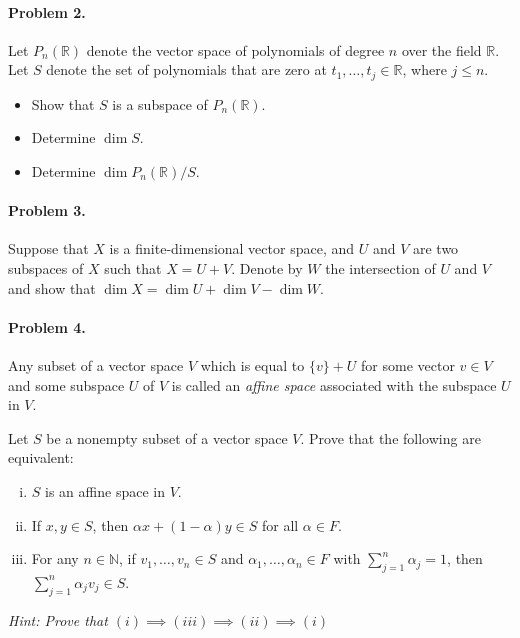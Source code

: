 \documentclass{article}
\begin{document}
\paragraph*{Problem 2.}	Let $P_{n}(\mathbb{R})$ denote the vector space of polynomials of degree $n$ over the field $\mathbb{R}$. Let $S$ denote the set of polynomials that are zero at $t_{1},\ldots,t_{j}\in \mathbb{R}$, where $j\leq n$.
\begin{itemize}
\item	Show that $S$ is a subspace of $P_{n}(\mathbb{R})$. 
\item	Determine $\dim S$.
\item	Determine $\dim P_{n}(\mathbb{R})/S$.
\end{itemize}

\paragraph*{Problem 3.}	Suppose that $X$ is a finite-dimensional vector space, and $U$ and $V$ are two subspaces of $X$ such that $X=U+V$. Denote by $W$ the intersection of $U$ and $V$ and show that $\dim X = \dim U + \dim V - \dim W$. 

\paragraph*{Problem 4.}	Any subset of a vector space $V$ which is equal to $\{v\}+U$ for some vector $v\in V$ and some subspace $U$ of $V$ is called an \emph{affine space} associated with the subspace $U$ in $V$.

Let $S$ be a nonempty subset of a vector space $V$. Prove that the following are equivalent:
\begin{enumerate}[(i)]
\item	$S$ is an affine space in $V$.
\item	If $x,y\in S$, then $\alpha x+(1-\alpha)y\in S$ for all $\alpha\in F$. 
\item	For any $n\in\mathbb{N}$, if $v_{1},\ldots,v_{n}\in S$ and $\alpha_{1},\ldots,\alpha_{n}\in F$ with $\sum_{j=1}^{n}\alpha_{j}=1$, then $\sum_{j=1}^{n}\alpha_{j}v_{j}\in S$. 
\end{enumerate}
\emph{Hint: Prove that $(i)\implies(iii)\implies(ii)\implies(i)$}
\end{document}
